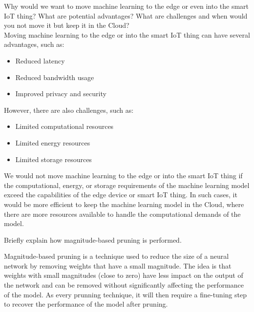 \begin{ejercicio}
    Why would we want to move machine learning to the edge or even into the smart IoT thing? What are potential advantages? What are challenges and when would you not move it but keep it in the Cloud?\\

    Moving machine learning to the edge or into the smart IoT thing can have several advantages, such as:
    \begin{itemize}
        \item Reduced latency
        \item Reduced bandwidth usage
        \item Improved privacy and security
    \end{itemize}
    However, there are also challenges, such as:
    \begin{itemize}
        \item Limited computational resources
        \item Limited energy resources
        \item Limited storage resources
    \end{itemize}
    We would not move machine learning to the edge or into the smart IoT thing if the computational, energy, or storage requirements of the machine learning model exceed the capabilities of the edge device or smart IoT thing. In such cases, it would be more efficient to keep the machine learning model in the Cloud, where there are more resources available to handle the computational demands of the model.
\end{ejercicio}

\begin{ejercicio}
    Briefly explain how magnitude-based pruning is performed.

    Magnitude-based pruning is a technique used to reduce the size of a neural network by removing weights that have a small magnitude. The idea is that weights with small magnitudes (close to zero) have less impact on the output of the network and can be removed without significantly affecting the performance of the model. As every prunning technique, it will then require a fine-tuning step to recover the performance of the model after pruning.
\end{ejercicio}

